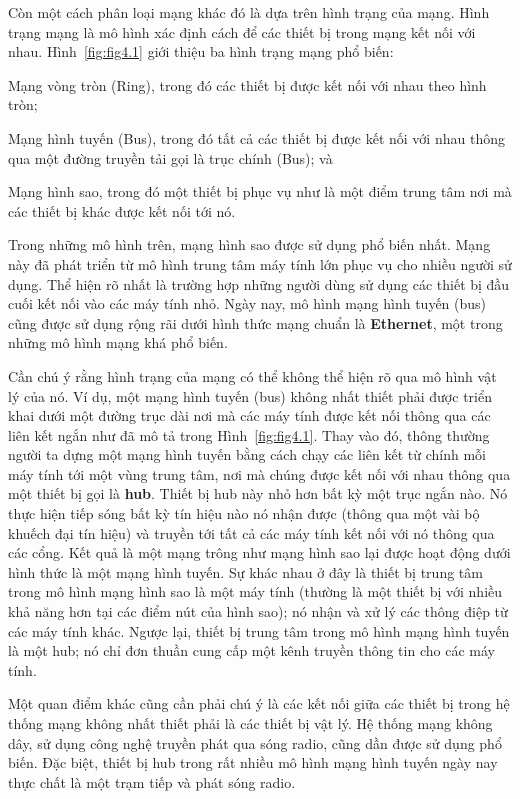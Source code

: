 Còn một cách phân loại mạng khác đó là dựa trên hình trạng của mạng. Hình trạng mạng
là mô hình xác định cách để các thiết bị trong mạng kết nối với nhau. Hình~\ref{fig:fig4.1} giới
thiệu ba hình trạng mạng phổ biến:
\begin{inparaenum}[(1)]
\item Mạng vòng tròn (Ring), trong đó các thiết bị được kết nối với nhau
  theo hình tròn;
\item Mạng hình tuyến (Bus), trong đó tất cả các thiết bị được kết nối với nhau thông qua
  một đường truyền tải gọi là trục chính (Bus); và
\item Mạng hình sao, trong đó một thiết bị phục vụ như là một điểm trung tâm nơi mà các
  thiết bị khác được kết nối tới nó.
\end{inparaenum}

Trong những mô hình trên, mạng hình sao được sử dụng phổ biến nhất. Mạng này đã
phát triển từ mô hình trung tâm máy tính lớn phục vụ cho nhiều người sử dụng. Thể hiện rõ nhất là trường hợp những người dùng sử dụng các thiết bị đầu cuối kết nối vào các máy tính nhỏ. Ngày nay, mô hình mạng hình tuyến (bus) cũng
được sử dụng rộng rãi dưới hình thức mạng chuẩn là \textbf{Ethernet}, một
trong những mô hình mạng khá phổ biến.

Cần chú ý rằng hình trạng của mạng có thể không  thể hiện rõ qua mô hình vật
lý của nó. Ví dụ, một mạng hình tuyến (bus) không nhất thiết phải được triển khai
dưới một đường trục dài nơi mà các máy tính được kết nối thông qua các liên kết ngắn như
đã mô tả trong Hình~\ref{fig:fig4.1}. Thay vào đó, thông thường người ta dựng một mạng
hình tuyến bằng cách chạy các liên kết từ chính mỗi máy tính tới một vùng trung tâm, nơi
mà chúng được kết nối với nhau thông qua một thiết bị gọi là \textbf{hub}. Thiết bị hub
này nhỏ hơn bất kỳ một trục ngắn nào. Nó thực hiện tiếp sóng bất kỳ tín hiệu nào nó nhận
được (thông qua một vài bộ khuếch đại tín hiệu) và truyền tới tất cả các máy tính kết nối
với nó thông qua các cổng. Kết quả là một mạng trông như mạng hình sao lại được hoạt động
dưới hình thức là một mạng hình tuyến. Sự khác nhau ở đây là thiết bị trung tâm trong mô
hình mạng hình sao là một máy tính (thường là một thiết bị với nhiều khả năng hơn tại các
điểm nút của hình sao); nó  nhận và xử lý các thông điệp từ các máy tính khác. Ngược lại, thiết
bị trung tâm trong mô hình mạng hình tuyến là một hub; nó  chỉ đơn thuần cung cấp một kênh truyền
thông tin cho các máy tính.

Một quan điểm khác cũng cần phải chú ý là các kết nối giữa các thiết bị trong hệ thống
mạng không nhất thiết phải là các thiết bị vật lý. Hệ thống mạng không dây, sử dụng công
nghệ truyền phát qua sóng radio, cũng dần được sử dụng phổ biến. Đặc biệt, thiết bị hub
trong rất nhiều mô hình mạng hình tuyến ngày nay thực chất là một trạm tiếp và phát sóng
radio.

